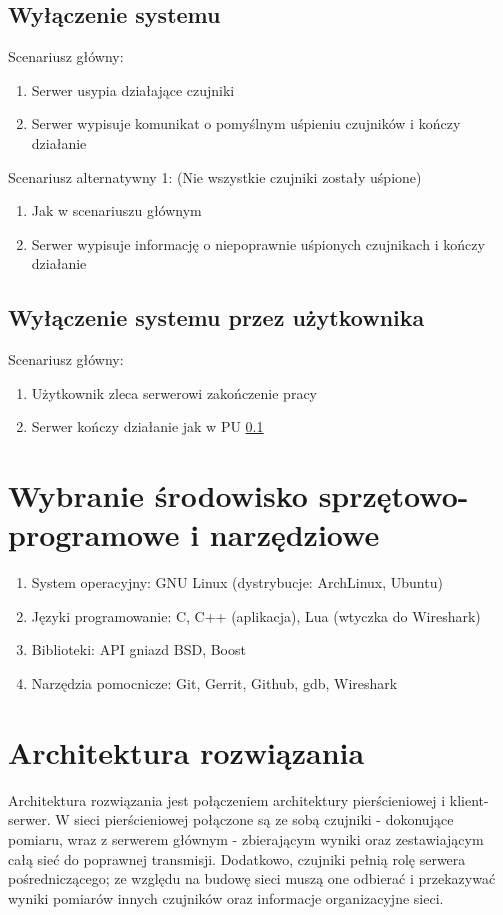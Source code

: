 \documentclass[a4paper,11pt]{article}
\begin{document}
\subsection{Wyłączenie systemu}\label{turnoff}
Scenariusz główny:
\begin{enumerate}
   \item Serwer usypia działające czujniki
   \item Serwer wypisuje komunikat o pomyślnym uśpieniu czujników i kończy działanie
\end{enumerate}
Scenariusz alternatywny 1: (Nie wszystkie czujniki zostały uśpione)
\begin{enumerate}
   \item Jak w scenariuszu głównym
   \item Serwer wypisuje informację o niepoprawnie uśpionych czujnikach i kończy działanie
\end{enumerate}

\subsection{Wyłączenie systemu przez użytkownika}
Scenariusz główny:
\begin{enumerate}
   \item Użytkownik zleca serwerowi zakończenie pracy
   \item Serwer kończy działanie jak w PU \ref{turnoff}
\end{enumerate}

\section{Wybranie środowisko sprzętowo-programowe i narzędziowe}

\begin{enumerate}
  \item System operacyjny: GNU Linux (dystrybucje: ArchLinux, Ubuntu)
  \item Języki programowanie: C, C++ (aplikacja), Lua (wtyczka do Wireshark)
  \item Biblioteki: API gniazd BSD, Boost
  \item Narzędzia pomocnicze: Git, Gerrit, Github, gdb, Wireshark
\end{enumerate}

\newpage
\section{Architektura rozwiązania}
Architektura rozwiązania jest połączeniem architektury pierścieniowej i klient-serwer.
W sieci pierścieniowej połączone są ze sobą czujniki - dokonujące pomiaru, wraz z serwerem głównym -
zbierającym wyniki oraz zestawiającym całą sieć do poprawnej transmisji. Dodatkowo,
czujniki pełnią rolę serwera pośredniczącego; ze względu na budowę sieci muszą one
odbierać i przekazywać wyniki pomiarów innych czujników oraz informacje organizacyjne sieci.
\end{document}
